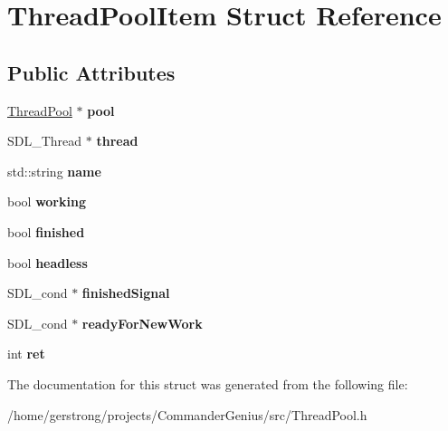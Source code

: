 \hypertarget{struct_thread_pool_item}{
\section{ThreadPoolItem Struct Reference}
\label{struct_thread_pool_item}
}
\subsection*{Public Attributes}
\begin{DoxyCompactItemize}
\item 
\hypertarget{struct_thread_pool_item_a5e4ebe493d340d0924632f52ae307997}{
\hyperlink{class_thread_pool}{ThreadPool} $\ast$ {\bfseries pool}}
\label{struct_thread_pool_item_a5e4ebe493d340d0924632f52ae307997}

\item 
\hypertarget{struct_thread_pool_item_af476e0efb36113e96b9ef88c2a6ba332}{
SDL\_\-Thread $\ast$ {\bfseries thread}}
\label{struct_thread_pool_item_af476e0efb36113e96b9ef88c2a6ba332}

\item 
\hypertarget{struct_thread_pool_item_ac5e96936fa1037045ccff531cdae5888}{
std::string {\bfseries name}}
\label{struct_thread_pool_item_ac5e96936fa1037045ccff531cdae5888}

\item 
\hypertarget{struct_thread_pool_item_a1308cc1986bd5b96ff42af8217081227}{
bool {\bfseries working}}
\label{struct_thread_pool_item_a1308cc1986bd5b96ff42af8217081227}

\item 
\hypertarget{struct_thread_pool_item_a334784be74c30f144cb2a434d30a8c50}{
bool {\bfseries finished}}
\label{struct_thread_pool_item_a334784be74c30f144cb2a434d30a8c50}

\item 
\hypertarget{struct_thread_pool_item_aded0c88875cc434cbfbcf1711d090e15}{
bool {\bfseries headless}}
\label{struct_thread_pool_item_aded0c88875cc434cbfbcf1711d090e15}

\item 
\hypertarget{struct_thread_pool_item_a7139662ddd041feef1ccc1790cc042f7}{
SDL\_\-cond $\ast$ {\bfseries finishedSignal}}
\label{struct_thread_pool_item_a7139662ddd041feef1ccc1790cc042f7}

\item 
\hypertarget{struct_thread_pool_item_a78a7fc47fd1196acaa0b3e6853c53514}{
SDL\_\-cond $\ast$ {\bfseries readyForNewWork}}
\label{struct_thread_pool_item_a78a7fc47fd1196acaa0b3e6853c53514}

\item 
\hypertarget{struct_thread_pool_item_a38c2482e695f993bc35daa6b64d5a1fe}{
int {\bfseries ret}}
\label{struct_thread_pool_item_a38c2482e695f993bc35daa6b64d5a1fe}

\end{DoxyCompactItemize}


The documentation for this struct was generated from the following file:\begin{DoxyCompactItemize}
\item 
/home/gerstrong/projects/CommanderGenius/src/ThreadPool.h\end{DoxyCompactItemize}
